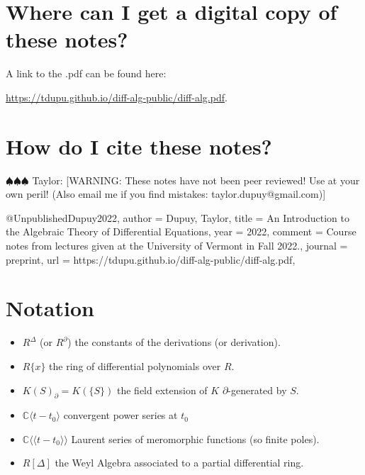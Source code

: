 \documentclass[12pt]{book}
\newcommand{\taylor}[1]{{\color{blue} \sf $\spadesuit\spadesuit\spadesuit$ Taylor: [#1]}}
\numberwithin{equation}{section}
\theoremstyle{definition}
\theoremstyle{remark}
\newcommand{\CC}{\mathbb{C}}
\newcommand{\llangle}{\langle \langle}
\newcommand{\rrangle}{\rangle \rangle}
\begin{document}
\fi


\section{Where can I get a digital copy of these notes?}
A link to the .pdf can be found here:
\begin{center}
	\url{https://tdupu.github.io/diff-alg-public/diff-alg.pdf}.
\end{center}

\section{How do I cite these notes?}

\taylor{WARNING: These notes have not been peer reviewed! Use at your own peril! (Also email me if you find mistakes: taylor.dupuy@gmail.com)}


\begin{spverbatim}
@Unpublished{Dupuy2022,
author  = {Dupuy, Taylor},
title   = {An Introduction to the Algebraic Theory of Differential Equations},
year    = {2022},
comment = {Course notes from lectures given at the University of Vermont in Fall 2022.},
journal = {preprint},
url     = {https://tdupu.github.io/diff-alg-public/diff-alg.pdf},
}
\end{spverbatim}


\newpage 
\section{Notation}
\begin{itemize}
	\item $R^{\Delta}$ (or $R^{\partial}$) the constants of the derivations (or derivation). 
	\item $R\lbrace x \rbrace$ the ring of differential polynomials over $R$.
	\item $K(S)_{\partial} = K(\lbrace S \rbrace)$ the field extension of $K$ $\partial$-generated by $S$.
	\item $\CC\langle t-t_0 \rangle$ convergent power series at $t_0$
	\item $\CC\llangle t-t_0\rrangle$ Laurent series of meromorphic functions (so finite poles).
	\item $R[\Delta]$ the Weyl Algebra associated to a partial differential ring.
\end{itemize}
\newpage

\mainmatter
\end{document}
